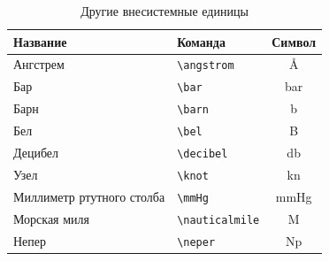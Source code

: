 \begin{table}
    \centering
    \begin{threeparttable}%
        \caption{Другие внесистемные единицы}\label{tab:unit:other}
        \begin{tabular}{llc}
            \toprule
            Название                  & Команда                 & Символ             \\
            \midrule
            Ангстрем                  & \verb|\angstrom| & \si{\angstrom}     \\
            Бар                       & \verb|\bar| & \si{\bar}          \\
            Барн                      & \verb|\barn| & \si{\barn}         \\
            Бел                       & \verb|\bel| & \si{\bel}          \\
            Децибел                   & \verb|\decibel| & \si{\decibel}      \\
            Узел                      & \verb|\knot| & \si{\knot}         \\
            Миллиметр ртутного столба & \verb|\mmHg| & \si{\mmHg}         \\
            Морская миля              & \verb|\nauticalmile| & \si{\nauticalmile} \\
            Непер                     & \verb|\neper| & \si{\neper}        \\
            \bottomrule
        \end{tabular}
    \end{threeparttable}
\end{table}

